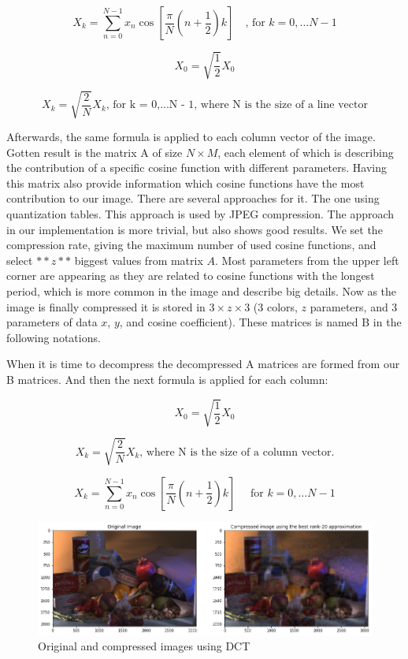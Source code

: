 $$ X_{k}=\sum_{n=0}^{N-1} x_{n} \cos \left[\frac{\pi}{N}\left(n+\frac{1}{2}\right) k\right] \quad \text {, for } k=0, \ldots N-1 $$

$$ X_{0}=\sqrt{\frac{1}{2}}X_{0} $$

$$ X_{k}=\sqrt{\frac{2}{N}}X_{k} \text {, for k = 0,...N - 1, where N is the size of a line vector}$$ 

Afterwards, the same formula is applied to each column vector of the image.
Gotten result is the matrix A of size $N \times M$, each element of which is describing the contribution of a specific cosine function with different parameters. Having this matrix also provide information which cosine functions have the most contribution to our image. There are several approaches for it. The one using quantization tables. This approach is used by JPEG compression. The approach in our implementation is more trivial, but also shows good results. We set the compression rate, giving the maximum number of used cosine functions, and select $**z**$ biggest values from matrix $A$. Most parameters from the upper left corner are appearing as they are related to cosine functions with the longest period, which is more common in the image and describe big details.
Now as the image is finally compressed it is stored in $3 \times z \times 3$ ($3$ colors, $z$ parameters, and $3$ parameters of data $x$, $y$, and cosine coefficient). These matrices is named B in the following notations.

When it is time to decompress the decompressed A matrices are formed from our B matrices. And then the next formula is applied for each column:

$$ X_{0}=\sqrt{\frac{1}{2}}X_{0} $$

$$ X_{k}=\sqrt{\frac{2}{N}}X_{k} \text{, where N is the size of a column vector.} $$

$$ X_{k}=\sum_{n=0}^{N-1} x_{n} \cos \left[\frac{\pi}{N}\left(n+\frac{1}{2}\right) k\right] \quad \text { for } k=0, \ldots N-1 $$ 

\begin{figure}[H]
  \centering
  \includegraphics[width=\linewidth]{comparsion.png}
  \caption{Original and compressed images using DCT}
  \label{fig:com_dct}
\end{figure}

